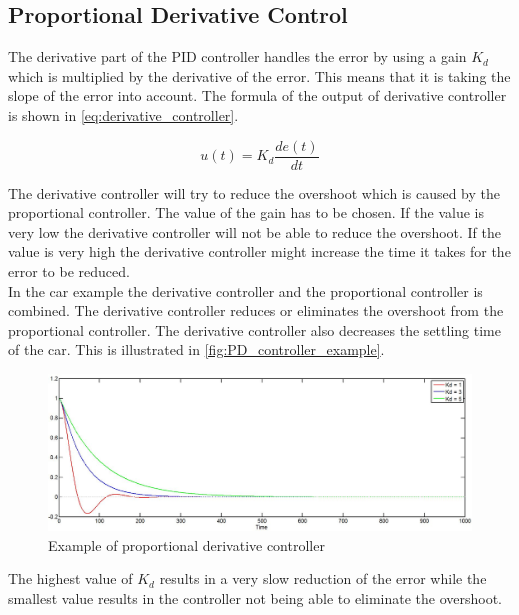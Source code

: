 
\subsection{Proportional Derivative Control} %
\label{sub:proportional_derivative_control}

The derivative part of the PID controller handles the error by using a gain $K_d$ which is multiplied by the derivative of the error. This means that it is taking the slope of the error into account. The formula of the output of derivative controller is shown in \autoref{eq:derivative_controller}.

\begin{equation}
\label{eq:derivative_controller}
u(t)=K_d \frac{de(t)}{dt}
\end{equation}

The derivative controller will try to reduce the overshoot which is caused by the proportional controller. The value of the gain has to be chosen. If the value is very low the derivative controller will not be able to reduce the overshoot. If the value is very high the derivative controller might increase the time it takes for the error to be reduced.\\

In the car example the derivative controller and the proportional controller is combined. The derivative controller reduces or eliminates the overshoot from the proportional controller. The derivative controller also decreases the settling time of the car. This is illustrated in \autoref{fig:PD_controller_example}. \\

\begin{figure}[H]
\centering
\includegraphics[scale=0.35]{images/PDcontroller.jpg}
\caption{Example of proportional derivative controller}
\label{fig:PD_controller_example}
\end{figure}

The highest value of $K_d$ results in a very slow reduction of the error while the smallest value results in the controller not being able to eliminate the overshoot.

